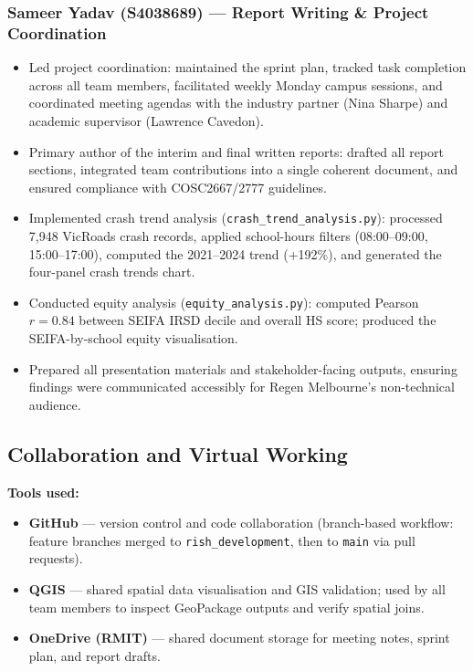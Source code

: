 \documentclass[11pt,a4paper]{article}
\begin{document}
\subsubsection*{Sameer Yadav (S4038689) — Report Writing \& Project Coordination}
\begin{itemize}
  \item Led project coordination: maintained the sprint plan, tracked task completion across all team members, facilitated weekly Monday campus sessions, and coordinated meeting agendas with the industry partner (Nina Sharpe) and academic supervisor (Lawrence Cavedon).
  \item Primary author of the interim and final written reports: drafted all report sections, integrated team contributions into a single coherent document, and ensured compliance with COSC2667/2777 guidelines.
  \item Implemented crash trend analysis (\texttt{crash\_trend\_analysis.py}): processed 7,948 VicRoads crash records, applied school-hours filters (08:00--09:00, 15:00--17:00), computed the 2021--2024 trend (+192\%), and generated the four-panel crash trends chart.
  \item Conducted equity analysis (\texttt{equity\_analysis.py}): computed Pearson $r = 0.84$ between SEIFA IRSD decile and overall HS score; produced the SEIFA-by-school equity visualisation.
  \item Prepared all presentation materials and stakeholder-facing outputs, ensuring findings were communicated accessibly for Regen Melbourne's non-technical audience.
\end{itemize}

\subsection*{Collaboration and Virtual Working}

\textbf{Tools used:}
\begin{itemize}
  \item \textbf{GitHub} — version control and code collaboration (branch-based workflow: feature branches merged to \texttt{rish\_development}, then to \texttt{main} via pull requests).
  \item \textbf{QGIS} — shared spatial data visualisation and GIS validation; used by all team members to inspect GeoPackage outputs and verify spatial joins.
  \item \textbf{OneDrive (RMIT)} — shared document storage for meeting notes, sprint plan, and report drafts.
\end{itemize}
\end{document}

